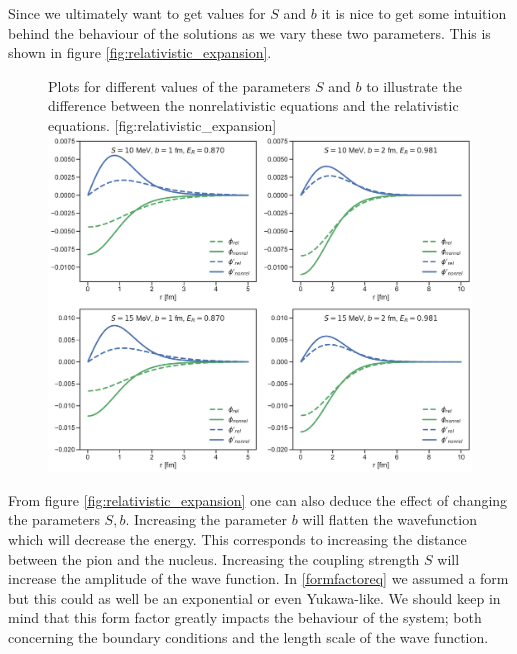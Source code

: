Since we ultimately want to get values for $S$ and $b$ it is nice to get some intuition behind the behaviour of the solutions as we vary these two parameters. This is shown in figure \ref{fig:relativistic_expansion}.
\begin{figure}[H]
	\begin{sidecaption}{Plots for different values of the parameters $S$ and $b$ to illustrate the difference between the nonrelativistic equations and the relativistic equations. }[fig:relativistic_expansion]
		\includegraphics[width=\linewidth]{Figures/RelativisticExpansion.pdf}
	\end{sidecaption}
\end{figure}
From figure \ref{fig:relativistic_expansion} one can also deduce the effect of changing the parameters $S,b$. Increasing the parameter $b$ will flatten the wavefunction which will decrease the energy. This corresponds to increasing the distance between the pion and the nucleus. Increasing the coupling strength $S$ will increase the amplitude of the wave function. In \eqref{formfactoreq} we assumed a form but this could as well be an exponential or even Yukawa-like. We should keep in mind that this form factor greatly impacts the behaviour of the system; both concerning the boundary conditions and the length scale of the wave function. 

